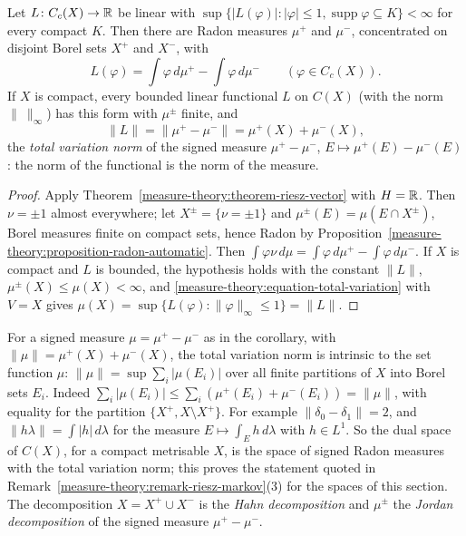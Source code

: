 \begin{corollary}\label{measure-theory:corollary-signed-riesz}
Let $L \colon C_c(X) \to \mathbb{R}$ be linear with $\sup\{|L(\varphi)| : |\varphi| \leq 1, \operatorname{supp}\varphi \subseteq K\} < \infty$ for every compact $K$. Then there are Radon measures $\mu^+$ and
$\mu^-$, concentrated on disjoint Borel sets $X^+$ and $X^-$, with
\[
L(\varphi) = \int\varphi\,d\mu^+ - \int\varphi\,d\mu^- \qquad (\varphi \in C_c(X)).
\]
If $X$ is compact, every bounded linear functional $L$ on $C(X)$ (with the norm $\|\ \|_\infty$) has this form with $\mu^\pm$ finite, and
\[
\|L\| = \|\mu^+ - \mu^-\| = \mu^+(X) + \mu^-(X),
\]
the \emph{total variation norm} of the signed measure $\mu^+ - \mu^-$, $E \mapsto \mu^+(E) - \mu^-(E)$: the norm of the functional is the norm of the measure.
\end{corollary}

\begin{proof}
Apply Theorem~\ref{measure-theory:theorem-riesz-vector} with $H = \mathbb{R}$. Then $\nu = \pm1$ almost everywhere; let $X^\pm = \{\nu = \pm1\}$ and $\mu^\pm(E) = \mu(E \cap X^\pm)$, Borel measures finite on compact
sets, hence Radon by Proposition~\ref{measure-theory:proposition-radon-automatic}. Then $\int\varphi\nu\,d\mu = \int\varphi\,d\mu^+ - \int\varphi\,d\mu^-$. If $X$ is compact and $L$ is bounded, the hypothesis
holds with the constant $\|L\|$, $\mu^\pm(X) \leq \mu(X) < \infty$, and \eqref{measure-theory:equation-total-variation} with $V = X$ gives $\mu(X) = \sup\{L(\varphi) : \|\varphi\|_\infty \leq 1\} = \|L\|$.
\end{proof}

For a signed measure $\mu = \mu^+ - \mu^-$ as in the corollary, with $\|\mu\| = \mu^+(X) + \mu^-(X)$, the total variation norm is intrinsic to the set function $\mu$:
$\|\mu\| = \sup\sum_i|\mu(E_i)|$ over all finite partitions of $X$ into Borel sets $E_i$. Indeed $\sum_i|\mu(E_i)| \leq \sum_i(\mu^+(E_i) + \mu^-(E_i)) = \|\mu\|$, with equality for the partition
$\{X^+, X \setminus X^+\}$. For example $\|\delta_0 - \delta_1\| = 2$, and $\|h\lambda\| = \int|h|\,d\lambda$ for the measure $E \mapsto \int_Eh\,d\lambda$ with $h \in L^1$.
So the dual space of $C(X)$, for a compact metrisable $X$, is the space of signed Radon measures with the total variation norm; this proves the statement quoted in
Remark~\ref{measure-theory:remark-riesz-markov}(3) for the spaces of this section. The decomposition $X = X^+ \cup X^-$ is the \emph{Hahn decomposition} and $\mu^\pm$ the \emph{Jordan decomposition} of the
signed measure $\mu^+ - \mu^-$.

